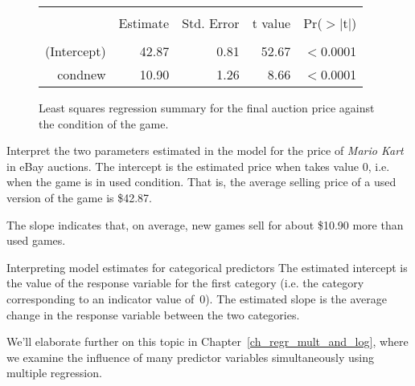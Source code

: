 \begin{figure}
\centering
\begin{tabular}{rrrrr}
  \hline
  \vspace{-3.7mm} & & & & \\
 & Estimate & Std. Error & t value & Pr($>$$|$t$|$) \\ 
  \hline
  \vspace{-3.6mm} & & & & \\
(Intercept) & 42.87 & 0.81 & 52.67 & $<$0.0001 \\ 
  cond\us{}new & 10.90 & 1.26 & 8.66 & $<$0.0001 \\ 
   \hline
\end{tabular}
\caption{Least squares regression summary for the final auction price against the condition of the game.}
\label{marioKartNewUsedRegrSummary}
\end{figure}

\begin{examplewrap}
\begin{nexample}{Interpret the two parameters estimated in the
    model for the price of \emph{Mario Kart} in eBay auctions.}
  The intercept is the estimated price when 
  takes value 0, i.e. when the game is in used condition.
  That is, the average selling price of a used version of
  the game is \$42.87.

  The slope indicates that, on average, new games sell for
  about \$10.90 more than used games.
\end{nexample}
\end{examplewrap}

\begin{onebox}{Interpreting model estimates for
    categorical predictors}
  The estimated intercept is the value of the response variable
  for the first category (i.e. the category corresponding to an
  indicator value of~0).
  The estimated slope is the average change in the response
  variable between the two categories.
\end{onebox}

We'll elaborate further on this topic in
Chapter~\ref{ch_regr_mult_and_log},
where we examine the influence of many
predictor variables simultaneously using
multiple regression.


{}








